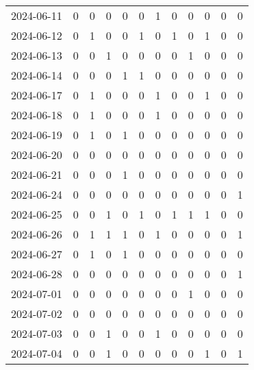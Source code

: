\documentclass[dvipdfmx,oneside]{article}
\begin{document}
\begin{tabular}{lccccccccccc}
        2024-06-11 &     0 &     0 &     0 &     0 &     0 &     1 &     0 &     0 &     0 &     0 &     0 \\
        2024-06-12 &     0 &     1 &     0 &     0 &     1 &     0 &     1 &     0 &     1 &     0 &     0 \\
        2024-06-13 &     0 &     0 &     1 &     0 &     0 &     0 &     0 &     1 &     0 &     0 &     0 \\
        2024-06-14 &     0 &     0 &     0 &     1 &     1 &     0 &     0 &     0 &     0 &     0 &     0 \\
        2024-06-17 &     0 &     1 &     0 &     0 &     0 &     1 &     0 &     0 &     1 &     0 &     0 \\
        2024-06-18 &     0 &     1 &     0 &     0 &     0 &     1 &     0 &     0 &     0 &     0 &     0 \\
        2024-06-19 &     0 &     1 &     0 &     1 &     0 &     0 &     0 &     0 &     0 &     0 &     0 \\
        2024-06-20 &     0 &     0 &     0 &     0 &     0 &     0 &     0 &     0 &     0 &     0 &     0 \\
        2024-06-21 &     0 &     0 &     0 &     1 &     0 &     0 &     0 &     0 &     0 &     0 &     0 \\
        2024-06-24 &     0 &     0 &     0 &     0 &     0 &     0 &     0 &     0 &     0 &     0 &     1 \\
        2024-06-25 &     0 &     0 &     1 &     0 &     1 &     0 &     1 &     1 &     1 &     0 &     0 \\
        2024-06-26 &     0 &     1 &     1 &     1 &     0 &     1 &     0 &     0 &     0 &     0 &     1 \\
        2024-06-27 &     0 &     1 &     0 &     1 &     0 &     0 &     0 &     0 &     0 &     0 &     0 \\
        2024-06-28 &     0 &     0 &     0 &     0 &     0 &     0 &     0 &     0 &     0 &     0 &     1 \\
        2024-07-01 &     0 &     0 &     0 &     0 &     0 &     0 &     0 &     1 &     0 &     0 &     0 \\
        2024-07-02 &     0 &     0 &     0 &     0 &     0 &     0 &     0 &     0 &     0 &     0 &     0 \\
        2024-07-03 &     0 &     0 &     1 &     0 &     0 &     1 &     0 &     0 &     0 &     0 &     0 \\
        2024-07-04 &     0 &     0 &     1 &     0 &     0 &     0 &     0 &     0 &     1 &     0 &     1 \\

\end{tabular}
\end{document}
